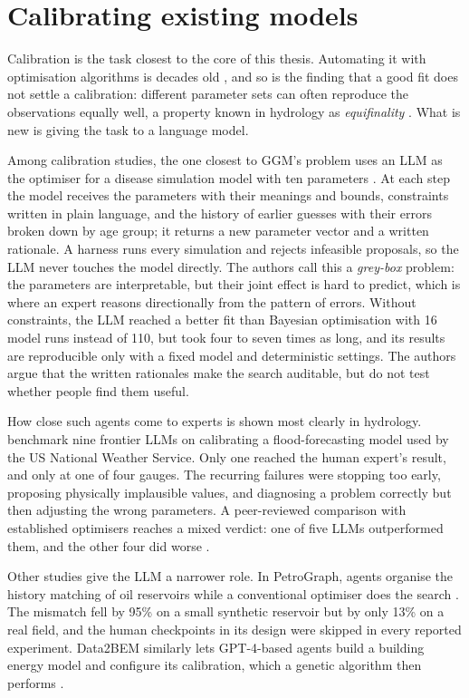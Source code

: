 \section{Calibrating existing models}

Calibration is the task closest to the core of this thesis.
Automating it with optimisation algorithms is decades old \citep{duan1992effective}, and so is the finding that a good fit does not settle a calibration: different parameter sets can often reproduce the observations equally well, a property known in hydrology as \emph{equifinality} \citep{beven2006manifesto}.
What is new is giving the task to a language model.

Among calibration studies, the one closest to GGM's problem uses an LLM as the optimiser for a disease simulation model with ten parameters \citep{gomezguillen2026agentic}.
At each step the model receives the parameters with their meanings and bounds, constraints written in plain language, and the history of earlier guesses with their errors broken down by age group; it returns a new parameter vector and a written rationale.
A harness runs every simulation and rejects infeasible proposals, so the LLM never touches the model directly.
The authors call this a \emph{grey-box} problem: the parameters are interpretable, but their joint effect is hard to predict, which is where an expert reasons directionally from the pattern of errors.
Without constraints, the LLM reached a better fit than Bayesian optimisation with 16 model runs instead of 110, but took four to seven times as long, and its results are reproducible only with a fixed model and deterministic settings.
The authors argue that the written rationales make the search auditable, but do not test whether people find them useful.

How close such agents come to experts is shown most clearly in hydrology.
\citet{li2026hydroagent} benchmark nine frontier LLMs on calibrating a flood-forecasting model used by the US National Weather Service.
Only one reached the human expert's result, and only at one of four gauges.
The recurring failures were stopping too early, proposing physically implausible values, and diagnosing a problem correctly but then adjusting the wrong parameters.
A peer-reviewed comparison with established optimisers reaches a mixed verdict: one of five LLMs outperformed them, and the other four did worse \citep{zhu2026large}.

Other studies give the LLM a narrower role.
In PetroGraph, agents organise the history matching of oil reservoirs while a conventional optimiser does the search \citep{samigullin2026multi}.
The mismatch fell by 95\% on a small synthetic reservoir but by only 13\% on a real field, and the human checkpoints in its design were skipped in every reported experiment.
Data2BEM similarly lets GPT-4-based agents build a building energy model and configure its calibration, which a genetic algorithm then performs \citep{lu2025automated}.

